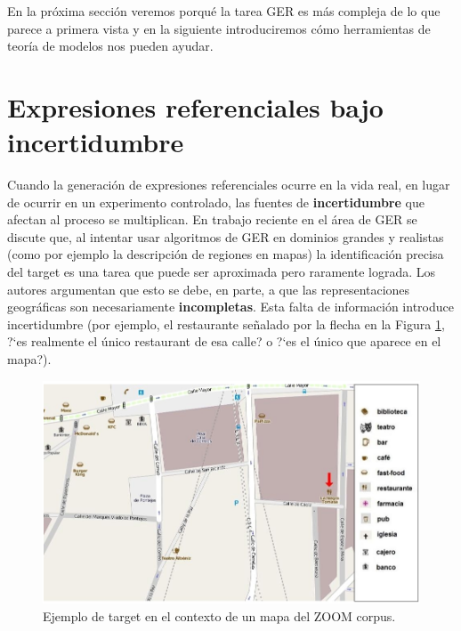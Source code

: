En la pr\'oxima secci\'on veremos porqu\'e la tarea GER es m\'as compleja de lo que parece a primera vista y en la siguiente introduciremos c\'omo herramientas de teor\'ia de modelos nos pueden ayudar.

\section{Expresiones referenciales bajo incertidumbre}
\label{sec:gre-incertidumbre}


Cuando la generaci\'on de expresiones referenciales ocurre en la vida real, en lugar de ocurrir en un experimento controlado, las fuentes de \textbf{incertidumbre} que afectan al proceso se multiplican. En trabajo 
reciente en el \'area de GER \cite{turner2008,turner2009} se discute que, al intentar usar algoritmos de GER en dominios grandes 
y realistas (como por ejemplo la descripci\'on de regiones en mapas) la identificaci\'on precisa del target es una tarea que puede ser 
aproximada pero raramente lograda. Los autores argumentan que esto se debe, en parte, a que las representaciones geogr\'aficas 
son necesariamente \textbf{incompletas}. Esta falta de informaci\'on introduce incertidumbre (por ejemplo, el restaurante se\~nalado por la flecha en la Figura \ref{target_mapa}, ?`es realmente el \'unico restaurant de esa calle? o ?`es el \'unico que aparece en el mapa?).

\begin{figure}[H]
\centering
\includegraphics[width=\textwidth]{images/corpus/mapa15.png}
\caption{Ejemplo de target en el contexto de un mapa del ZOOM corpus.}
\label{target_mapa}
\end{figure}

